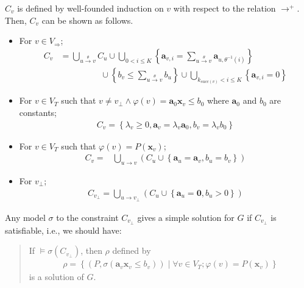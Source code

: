 \documentclass[master,final,12pt]{iscs-thesis}
\newcommand{\edge}[2]{#1\rightarrow#2}
\newcommand{\edgel}[3]{#1\xrightarrow{#2}#3}
\begin{document}
$C_v$ is defined by well-founded induction on $v$ with respect to the
relation $\rightarrow^+$. Then, $C_v$ can be shown as follows.
\begin{itemize}
\item For $v \in V_\Rightarrow$;
\begin{align*}
C_v & =
 \bigcup_{\edgel{u}{\theta}{v}} C_u \cup
 \bigcup_{0 < i \leq K}
 \left\lbrace
  \mathbf{a}_{v,i} = \sum_{\edgel{u}{\theta}{v}} \mathbf{a}_{u, \theta^{-1} (i)}
 \right\rbrace \\
 & \hspace{2cm} \cup
 \left\lbrace
  b_v \leq \sum_{\edgel{u}{\theta}{v}} b_u
 \right\rbrace \cup
 \bigcup_{k_{succ(v)} < i \leq K}
 \left\lbrace \mathbf{a}_{v,i} = 0 \right\rbrace
\end{align*}
\item For $v \in V_T$ such that
  $v \neq v_{\bot} \wedge \varphi(v) = \mathbf{a}_0 \mathbf{x}_v \leq b_0$
  where $\mathbf{a}_0$ and $b_0$ are constants;
\begin{align*}
C_v =
\left\lbrace
 \lambda_v \geq 0, \mathbf{a}_v = \lambda_v \mathbf{a}_0,
 b_v = \lambda_v b_0
\right\rbrace
\end{align*}
\item For $v \in V_T$ such that $\varphi(v) = P(\mathbf{x}_v)$;
\begin{align*}
C_v = & \bigcup_{\edge{u}{v}} \left( C_{u} \cup
\left\lbrace \mathbf{a}_u = \mathbf{a}_v, b_u = b_v \right\rbrace
\right)
\end{align*}
\item For $v_\bot$;
\begin{align*}
C_{v_\bot} = \bigcup_{\edge{u}{v_\bot}} \left( C_{u} \cup
\left\lbrace \mathbf{a}_u = \mathbf{0}, b_u > 0 \right\rbrace \right)
\end{align*}
\end{itemize}

Any model $\sigma$ to the constraint $C_{v_\bot}$ gives a simple
solution for $G$ if $C_{v_\bot}$ is satisfiable, i.e., we should have:

\begin{quote}
If $\models \sigma(C_{v_\bot})$, then $\rho$ defined by
\begin{align*}
 \rho = \left\lbrace
  \left( P, \sigma(\mathbf{a}_v \mathbf{x}_v \leq b_v) \right) \mid
  \forall v \in V_T; \varphi(v) = P(\mathbf{x}_v)
 \right\rbrace
\end{align*}
is a solution of $G$.
\end{quote}
\end{document}
